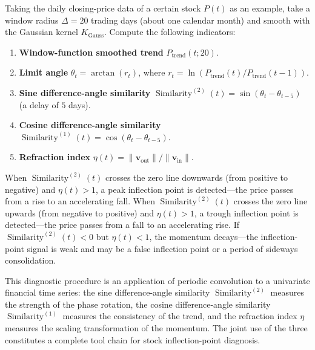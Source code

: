\begin{example}
Taking the daily closing-price data of a certain stock $P(t)$ as an example, take a window radius $\Delta = 20$ trading days (about one calendar month) and smooth with the Gaussian kernel $K_{\text{Gauss}}$. Compute the following indicators:
\begin{enumerate}[label=(\roman*)]
    \item \textbf{Window-function smoothed trend} $P_{\text{trend}}(t; 20)$.
    \item \textbf{Limit angle} $\theta_t = \arctan(r_t)$, where $r_t = \ln(P_{\text{trend}}(t)/P_{\text{trend}}(t-1))$.
    \item \textbf{Sine difference-angle similarity} $\operatorname{Similarity}^{(2)}(t) = \sin(\theta_t - \theta_{t-5})$ (a delay of $5$ days).
    \item \textbf{Cosine difference-angle similarity} $\operatorname{Similarity}^{(1)}(t) = \cos(\theta_t - \theta_{t-5})$.
    \item \textbf{Refraction index} $\eta(t) = \|\mathbf{v}_{\text{out}}\|/\|\mathbf{v}_{\text{in}}\|$.
\end{enumerate}
When $\operatorname{Similarity}^{(2)}(t)$ crosses the zero line downwards (from positive to negative) and $\eta(t) > 1$, a peak inflection point is detected---the price passes from a rise to an accelerating fall. When $\operatorname{Similarity}^{(2)}(t)$ crosses the zero line upwards (from negative to positive) and $\eta(t) > 1$, a trough inflection point is detected---the price passes from a fall to an accelerating rise. If $\operatorname{Similarity}^{(2)}(t) < 0$ but $\eta(t) < 1$, the momentum decays---the inflection-point signal is weak and may be a false inflection point or a period of sideways consolidation.

This diagnostic procedure is an application of periodic convolution to a univariate financial time series: the sine difference-angle similarity $\operatorname{Similarity}^{(2)}$ measures the strength of the phase rotation, the cosine difference-angle similarity $\operatorname{Similarity}^{(1)}$ measures the consistency of the trend, and the refraction index $\eta$ measures the scaling transformation of the momentum. The joint use of the three constitutes a complete tool chain for stock inflection-point diagnosis.
\end{example}

